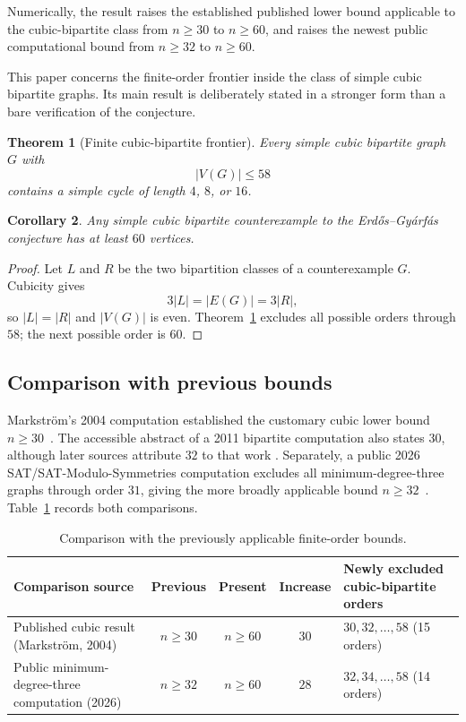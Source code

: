 \documentclass[11pt]{article}
\newtheorem{theorem}{Theorem}
\newtheorem{corollary}[theorem]{Corollary}
\theoremstyle{definition}
\begin{document}
Numerically, the result raises the established published lower bound
applicable to the cubic-bipartite class from \(n\geq30\) to \(n\geq60\), and
raises the newest public computational bound from \(n\geq32\) to
\(n\geq60\).

This paper concerns the finite-order frontier inside the class of simple
cubic bipartite graphs.  Its main result is deliberately stated in a
stronger form than a bare verification of the conjecture.

\begin{theorem}[Finite cubic-bipartite frontier]\label{thm:main}
Every simple cubic bipartite graph \(G\) with
\[
  |V(G)|\leq 58
\]
contains a simple cycle of length \(4\), \(8\), or \(16\).
\end{theorem}

\begin{corollary}\label{cor:bound}
Any simple cubic bipartite counterexample to the Erd\H{o}s--Gy\'arf\'as
conjecture has at least \(60\) vertices.
\end{corollary}

\begin{proof}
Let \(L\) and \(R\) be the two bipartition classes of a counterexample \(G\).
Cubicity gives
\[
  3|L|=|E(G)|=3|R|,
\]
so \(|L|=|R|\) and \(|V(G)|\) is even.  Theorem~\ref{thm:main} excludes all
possible orders through \(58\); the next possible order is \(60\).
\end{proof}

\subsection{Comparison with previous bounds}

Markstr\"om's 2004 computation established the customary cubic lower bound
\(n\geq30\)~\cite{Markstrom2004}. The accessible abstract of a 2011
bipartite computation also states \(30\), although later sources attribute
\(32\) to that work
\cite{NowbandeganiEsfandiari2011,NowbandeganiEtAl2014,HuShen2024}. Separately,
a public 2026 SAT/SAT-Modulo-Symmetries computation excludes all
minimum-degree-three graphs through order \(31\), giving the more broadly
applicable bound \(n\geq32\)~\cite{Balaji2026}. Table~\ref{tab:comparison}
records both comparisons.

\begin{table}[ht]
\centering
\small
\caption{Comparison with the previously applicable finite-order bounds.}
\label{tab:comparison}
\begin{tabularx}{\textwidth}{@{}Xcccl@{}}
\toprule
Comparison source & Previous & Present & Increase & Newly excluded
cubic-bipartite orders\\
\midrule
Published cubic result (Markstr\"om, 2004)
  & \(n\geq30\) & \(n\geq60\) & \(30\)
  & \(30,32,\ldots,58\) (15 orders)\\
Public minimum-degree-three computation (2026)
  & \(n\geq32\) & \(n\geq60\) & \(28\)
  & \(32,34,\ldots,58\) (14 orders)\\
\bottomrule
\end{tabularx}
\end{table}
\end{document}
